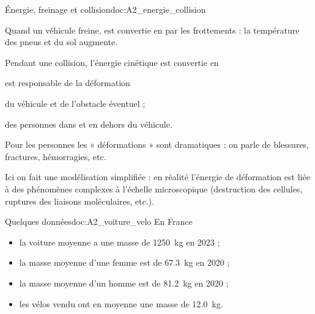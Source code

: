 \begin{doc}{Énergie, freinage et collision}{doc:A2_energie_collision}
  \begin{importants}
    Quand un véhicule freine,  est convertie en  par les frottements : la température des pneus et du sol augmente.
  
    Pendant une collision, l'énergie cinétique est convertie en 
  \end{importants}
  \begin{center}
  \end{center}
  
   est responsable de la déformation
  \begin{listePoints}
    \item du véhicule et de l'obstacle éventuel ;
    \item des personnes dans et en dehors du véhicule.
  \end{listePoints}
  Pour les personnes les « déformations » sont dramatiques : on parle de blessures, fractures, hémorragies, etc.

  \attention Ici on fait une modélisation simplifiée : en réalité l'énergie de déformation est liée à des phénomènes complexes à l'échelle microscopique (destruction des cellules, ruptures des liaisons moléculaires, etc.).
\end{doc}

\begin{doc}{Quelques données}{doc:A2_voiture_velo}
  En France 
  \begin{itemize}
      \item la voiture moyenne a une masse de \qty{1 250}{\kg} en 2023 ;
      \item la masse moyenne d'une femme est de \qty{67,3}{\kg} en 2020 ;
      \item la masse moyenne d'un homme est de \qty{81,2}{\kg} en 2020 ;
      \item les vélos vendu ont en moyenne une masse de \qty{12,0}{\kg}.
  \end{itemize}
\end{doc}



